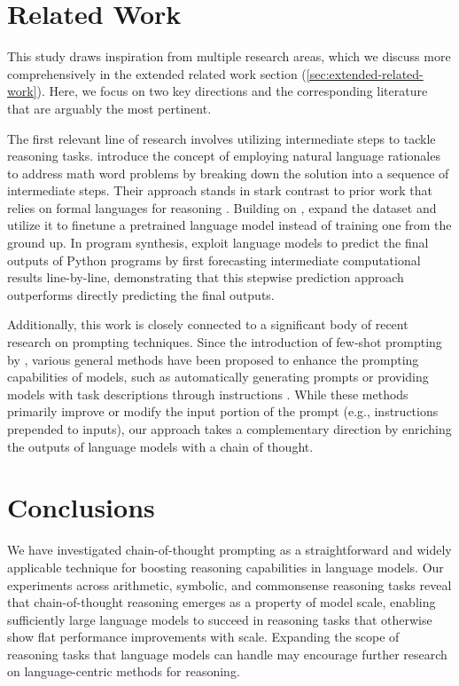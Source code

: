 \section{Related Work} This study draws inspiration from multiple research areas, which we discuss more comprehensively in the extended related work section (\cref{sec:extended-related-work}). Here, we focus on two key directions and the corresponding literature that are arguably the most pertinent.

The first relevant line of research involves utilizing intermediate steps to tackle reasoning tasks. \cite{ling-etal-2017-program} introduce the concept of employing natural language rationales to address math word problems by breaking down the solution into a sequence of intermediate steps. Their approach stands in stark contrast to prior work that relies on formal languages for reasoning \citep{roy-2016-reasoning, chiang-chen-2019-semantically, amini-etal-2019-mathqa, chen2019neural}. Building on \citet{ling-etal-2017-program}, \citet{cobbe2021training} expand the dataset and utilize it to finetune a pretrained language model instead of training one from the ground up. In program synthesis, \cite{nye2021show} exploit language models to predict the final outputs of Python programs by first forecasting intermediate computational results line-by-line, demonstrating that this stepwise prediction approach outperforms directly predicting the final outputs.

Additionally, this work is closely connected to a significant body of recent research on prompting techniques. Since the introduction of few-shot prompting by \citet{brown2020language}, various general methods have been proposed to enhance the prompting capabilities of models, such as automatically generating prompts \citep{lester-etal-2021-power} or providing models with task descriptions through instructions \citep{wei2021finetuned,sanh2021multitask,ouyang2022training}. While these methods primarily improve or modify the input portion of the prompt (e.g., instructions prepended to inputs), our approach takes a complementary direction by enriching the outputs of language models with a chain of thought.

\section{Conclusions} We have investigated chain-of-thought prompting as a straightforward and widely applicable technique for boosting reasoning capabilities in language models. Our experiments across arithmetic, symbolic, and commonsense reasoning tasks reveal that chain-of-thought reasoning emerges as a property of model scale, enabling sufficiently large language models to succeed in reasoning tasks that otherwise show flat performance improvements with scale. Expanding the scope of reasoning tasks that language models can handle may encourage further research on language-centric methods for reasoning.

